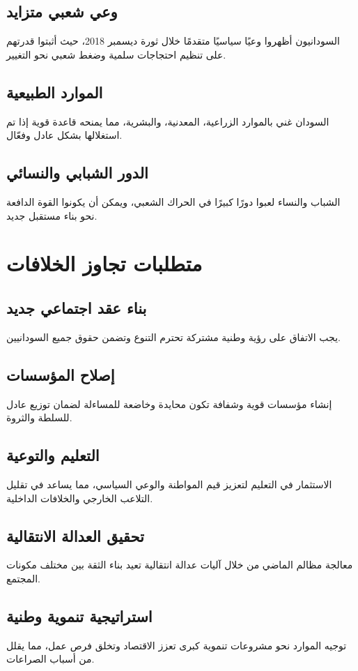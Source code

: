 \documentclass[12pt]{article}
\begin{document}
\subsection{وعي شعبي متزايد}
السودانيون أظهروا وعيًا سياسيًا متقدمًا خلال ثورة ديسمبر 2018، حيث أثبتوا قدرتهم على تنظيم احتجاجات سلمية وضغط شعبي نحو التغيير.

\subsection{الموارد الطبيعية}
السودان غني بالموارد الزراعية، المعدنية، والبشرية، مما يمنحه قاعدة قوية إذا تم استغلالها بشكل عادل وفعّال.

\subsection{الدور الشبابي والنسائي}
الشباب والنساء لعبوا دورًا كبيرًا في الحراك الشعبي، ويمكن أن يكونوا القوة الدافعة نحو بناء مستقبل جديد.

\section{متطلبات تجاوز الخلافات}
\subsection{بناء عقد اجتماعي جديد}
يجب الاتفاق على رؤية وطنية مشتركة تحترم التنوع وتضمن حقوق جميع السودانيين.

\subsection{إصلاح المؤسسات}
إنشاء مؤسسات قوية وشفافة تكون محايدة وخاضعة للمساءلة لضمان توزيع عادل للسلطة والثروة.

\subsection{التعليم والتوعية}
الاستثمار في التعليم لتعزيز قيم المواطنة والوعي السياسي، مما يساعد في تقليل التلاعب الخارجي والخلافات الداخلية.

\subsection{تحقيق العدالة الانتقالية}
معالجة مظالم الماضي من خلال آليات عدالة انتقالية تعيد بناء الثقة بين مختلف مكونات المجتمع.

\subsection{استراتيجية تنموية وطنية}
توجيه الموارد نحو مشروعات تنموية كبرى تعزز الاقتصاد وتخلق فرص عمل، مما يقلل من أسباب الصراعات.
\end{document}
